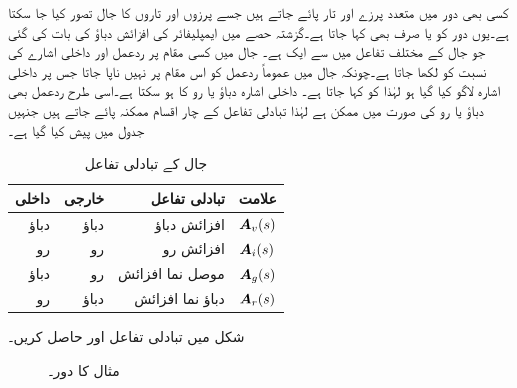 کسی بھی دور میں متعدد پرزے اور تار پائے جاتے ہیں جسے پرزوں اور تاروں کا جال تصور کیا جا سکتا ہے۔یوں دور کو  یا صرف  بھی کہا جاتا ہے۔گزشتہ حصے میں ایمپلیفائر کی افزائش دباؤ  کی بات کی گئی جو جال کے مختلف تفاعل  میں سے ایک ہے۔ جال میں کسی مقام پر ردعمل اور داخلی اشارے کی نسبت کو  لکھا جاتا ہے۔چونکہ جال میں عموماً ردعمل کو اس مقام پر نہیں ناپا جاتا جس پر داخلی اشارہ لاگو کیا گیا ہو لہٰذا  کو   کہا جاتا ہے۔ داخلی اشارہ دباؤ یا رو کا ہو سکتا ہے۔اسی طرح ردعمل بھی دباؤ یا رو کی صورت میں ممکن ہے لہٰذا تبادلی تفاعل کے چار اقسام ممکنہ پائے جاتے ہیں جنہیں جدول  میں پیش کیا گیا ہے۔
\begin{table}\caption{جال کے تبادلی تفاعل}
\centering
\begin{tabular}{r r r l}
داخلی & خارجی& تبادلی تفاعل& علامت\\
\hline
دباؤ&دباؤ&افزائش دباؤ&${{\boldsymbol{A}}}_v(s)$ \\
رو&رو&افزائش رو&${{\boldsymbol{A}}}_i(s)$ \\
دباؤ&رو&موصل نما افزائش& ${{\boldsymbol{A}}}_g(s)$\\
رو&دباؤ&دباؤ نما افزائش&${{\boldsymbol{A}}}_r(s)$ 
\end{tabular}\label{جدول_تعددی_جال_تبادلی_تفاعل}
\end{table} 

شکل  میں تبادلی تفاعل  اور  حاصل کریں۔
\begin{figure}
\centering
{}
\caption{مثال  کا دور۔}
\label{شکل_تعددی_تبادلی_تفاعل_الف}
\end{figure}

